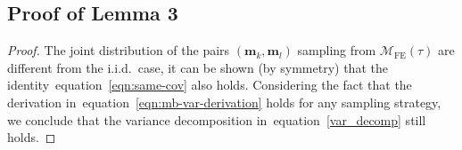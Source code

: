 \documentclass{article} \usepackage{iclr2021_conference,times}
\def\eqref#1{equation~\ref{#1}}
\theoremstyle{plain}
\begin{document}
\subsection{Proof of Lemma 3}
\label{sec:lemm3}
\begin{proof}
The joint distribution of the pairs $(\mathbf{m}_k,\mathbf{m}_l)$ sampling from $\mathcal{M}_{\text{FE}}(\tau)$ are different from the i.i.d.\ case, it can be shown (by symmetry) that the identity~\eqref{eqn:same-cov} also holds.
Considering the fact that the derivation in~\eqref{eqn:mb-var-derivation} holds for any sampling strategy, we conclude that the variance decomposition in~\eqref{var_decomp} still holds. 
\end{proof}
\end{document}
